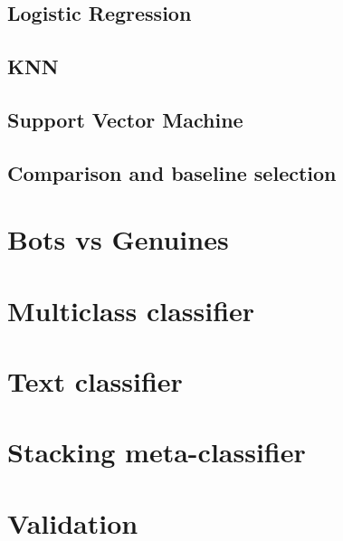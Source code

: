 \subsection{Logistic Regression}
\subsection{KNN}
\subsection{Support Vector Machine}
\subsection{Comparison and baseline selection}
\section{Bots vs Genuines}
\section{Multiclass classifier}
\section{Text classifier}
\section{Stacking meta-classifier}
\section{Validation}